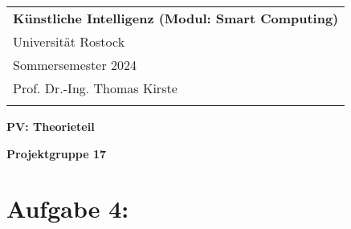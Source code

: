 \documentclass[a4paper,12pt]{article} %
\begin{document}



\thispagestyle{empty} %

\begin{tabular}{p{15.5cm}} %
{\large \bf Künstliche Intelligenz (Modul: Smart Computing)} \\
Universität Rostock \\ Sommersemester 2024  \\ Prof. Dr.-Ing. Thomas Kirste\\
\hline %
\\
\end{tabular} %

\vspace*{0.3cm} %

\begin{center} %
	{\Large \bf PV: Theorieteil} %
	\vspace{2mm}
	
	{\bf Projektgruppe 17} %
		
\end{center}  

\vspace{0.4cm}




\section*{Aufgabe 4:}
\end{document}
